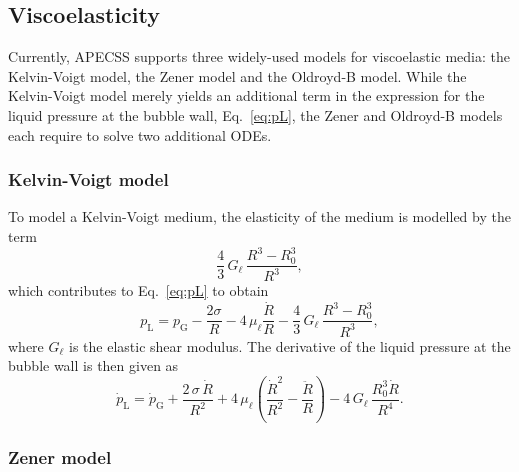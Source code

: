 \subsection{Viscoelasticity}

Currently, APECSS supports three widely-used models for viscoelastic media: the Kelvin-Voigt model, the Zener model and the Oldroyd-B model. While the Kelvin-Voigt model merely yields an additional term in the expression for the liquid pressure at the bubble wall, Eq.~\eqref{eq:pL}, the Zener and Oldroyd-B models each require to solve two additional ODEs.

\subsubsection{Kelvin-Voigt model}

To model a Kelvin-Voigt medium, the elasticity of the medium is modelled by the term 
\begin{equation}
    \frac{4}{3} \, G_\ell \, \frac{R^3-R_0^3}{R^3}, \label{eq:KVterm}
\end{equation}
which contributes to Eq.~\eqref{eq:pL} to obtain
\begin{equation}
    p_\text{L} = p_\text{G} - \frac{2 \sigma}{R} - 4 \, \mu_\ell \frac{\dot{R}}{R} - \frac{4}{3} \, G_\ell \, \frac{R^3-R_0^3}{R^3}, \label{eq:pL_KV}
\end{equation}
where $G_\ell$ is the elastic shear modulus.
The derivative of the liquid pressure at the bubble wall is then given as
\begin{equation}
    \dot{p}_\mathrm{L} = \dot{p}_\mathrm{G} + \frac{2 \, \sigma \, \dot{R}}{R^2} + 4 \, \mu_\ell \left(\frac{\dot{R}^2}{R^2} - \frac{\ddot{R}}{R}\right) - 4 \, G_\ell \, \frac{R_0^3 \dot{R}}{R^4}.
    \label{eq:dotpL_KV}
\end{equation}

\subsubsection{Zener model}

